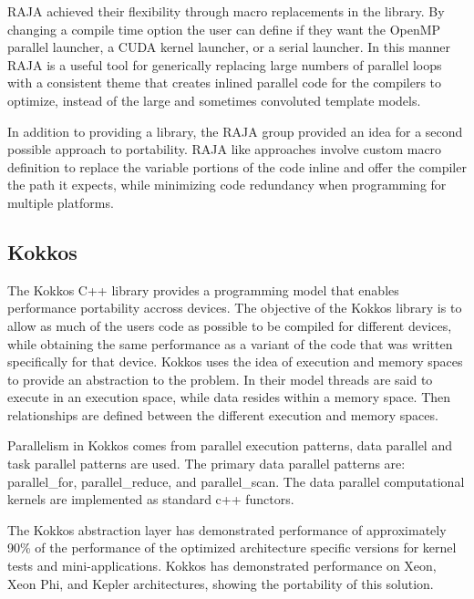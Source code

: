 RAJA achieved their flexibility through macro replacements in the library.
%
By changing a compile time option the user can define if they want the OpenMP parallel launcher, a CUDA kernel launcher, or a serial launcher.
%
In this manner RAJA is a useful tool for generically replacing large numbers of parallel loops with a consistent theme that creates inlined parallel code for the compilers to optimize, instead of the large and sometimes convoluted template models.
%
\cite{hornung2014raja}
\cite{hornung2016raja}

In addition to providing a library, the RAJA group provided an idea for a second possible approach to portability.
%
RAJA like approaches involve custom macro definition to replace the variable portions of the code inline and offer the compiler the path it expects, while minimizing code redundancy when programming for multiple platforms.

\subsection*{\textbf{Kokkos}}

The Kokkos C++ library provides a programming model that enables performance portability accross devices.
%
The objective of the Kokkos library is to allow as much of the users code as possible to be compiled for different devices, while obtaining the same performance as a variant of the code that was written specifically for that device.
%
Kokkos uses the idea of execution and memory spaces to provide an abstraction to the problem.
%
In their model threads are said to execute in an execution space, while data resides within a memory space.
%
Then relationships are defined between the different execution and memory spaces.
\cite{edwards2014kokkos}

Parallelism in Kokkos comes from parallel execution patterns, data parallel and task parallel patterns are used.
%
The primary data parallel patterns are: parallel\_for, parallel\_reduce, and parallel\_scan.
%
The data parallel computational kernels are implemented as standard c++ functors.
%

The Kokkos abstraction layer has demonstrated performance of approximately 90\% of the performance of the optimized architecture specific versions for kernel tests and mini-applications.
%
Kokkos has demonstrated performance on Xeon, Xeon Phi, and Kepler architectures, showing the portability of this solution.
\cite{edwards2014kokkos}
\cite{edwards2012manycore}

